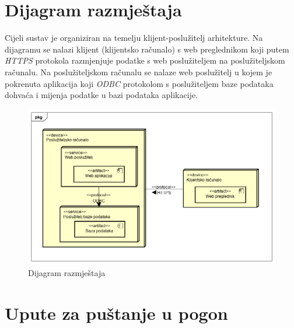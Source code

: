 			
			\eject 
		
		
		\section{Dijagram razmještaja}
%			
%			
	
	
		Cijeli sustav je organiziran na temelju klijent-poslužitelj arhitekture. Na dijagramu se nalazi klijent (klijentsko računalo) s web preglednikom koji putem \textit{HTTPS} protokola razmjenjuje podatke s web poslužiteljem na poslužiteljskom računalu. Na poslužiteljskom računalu se nalaze web poslužitelj u kojem je pokrenuta aplikacija koji \textit{ODBC} protokolom s poslužiteljem baze podataka dohvaća i mijenja podatke u bazi podataka aplikacije.
		
		\begin{figure}[h]
			\centering
			\includegraphics[width=1\linewidth]{dijagrami/deployment_diagram}
			\caption{Dijagram razmještaja}
			\label{fig:deploymentdiagram}
		\end{figure}
			
			\eject 
		
		\section{Upute za puštanje u pogon}
		
